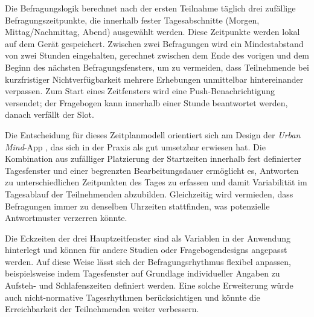 Die Befragungslogik berechnet nach der ersten Teilnahme täglich drei zufällige Befragungszeitpunkte, die innerhalb fester Tagesabschnitte (Morgen, Mittag/Nachmittag, Abend) ausgewählt werden. Diese Zeitpunkte werden lokal auf dem Gerät gespeichert. Zwischen zwei Befragungen wird ein Mindestabstand von zwei Stunden eingehalten, gerechnet zwischen dem Ende des vorigen und dem Beginn des nächsten Befragungsfensters, um zu vermeiden, dass Teilnehmende bei kurzfristiger Nichtverfügbarkeit mehrere Erhebungen unmittelbar hintereinander verpassen. Zum Start eines Zeitfensters wird eine Push-Benachrichtigung versendet; der Fragebogen kann innerhalb einer Stunde beantwortet werden, danach verfällt der Slot.

Die Entscheidung für dieses Zeitplanmodell orientiert sich am Design der \textit{Urban Mind}-App \parencite{bakolisUrbanMindUsing2018}, das sich in der Praxis als gut umsetzbar erwiesen hat. Die Kombination aus zufälliger Platzierung der Startzeiten innerhalb fest definierter Tagesfenster und einer begrenzten Bearbeitungsdauer ermöglicht es, Antworten zu unterschiedlichen Zeitpunkten des Tages zu erfassen und damit Variabilität im Tagesablauf der Teilnehmenden abzubilden. Gleichzeitig wird vermieden, dass Befragungen immer zu denselben Uhrzeiten stattfinden, was potenzielle Antwortmuster verzerren könnte.

Die Eckzeiten der drei Hauptzeitfenster sind als Variablen in der Anwendung hinterlegt und können für andere Studien oder Fragebogendesigns angepasst werden. Auf diese Weise lässt sich der Befragungsrhythmus flexibel anpassen, beispielsweise indem Tagesfenster auf Grundlage individueller Angaben zu Aufsteh- und Schlafenszeiten definiert werden. Eine solche Erweiterung würde auch nicht-normative Tagesrhythmen berücksichtigen und könnte die Erreichbarkeit der Teilnehmenden weiter verbessern.

